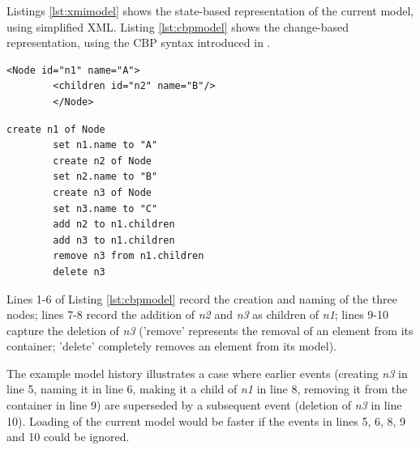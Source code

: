 \documentclass{llncs}
\begin{document}
    Listings \ref{lst:xmimodel} shows the state-based representation of the current model, using simplified XML.  Listing \ref{lst:cbpmodel} shows the change-based representation, using the CBP syntax introduced in \cite{yohannis2017turning}.
    
    \noindent
    \begin{minipage}[t]{0.5\linewidth}
        \begin{lstlisting}[style=xmi,caption={State-based tree model.},label=lst:xmimodel]
        <Node id="n1" name="A">
        <children id="n2" name="B"/>
        </Node>
        \end{lstlisting}
    \end{minipage}
    \hfill
    \begin{minipage}[t]{0.5\linewidth}
        \begin{lstlisting}[style=eol,caption={Change-based tree model.},label=lst:cbpmodel]
        create n1 of Node
        set n1.name to "A"      
        create n2 of Node
        set n2.name to "B"      
        create n3 of Node
        set n3.name to "C"      
        add n2 to n1.children   
        add n3 to n1.children
        remove n3 from n1.children   
        delete n3
        \end{lstlisting}
    \end{minipage}
    
    Lines 1-6 of Listing \ref{lst:cbpmodel} 
    record the creation and naming of the three nodes; lines 7-8 record the addition of \emph{n2} and \emph{n3} as children of \emph{n1}; lines 9-10 capture the deletion of \emph{n3} ('remove'   represents the removal of an element from its container; 'delete' completely removes an element from its model).
    
    
    
    The example model history illustrates a case where  earlier events (creating \emph{n3} in line 5, naming it in line 6, making it a child of \emph{n1} in line 8, removing it from the container in line 9) are superseded by a subsequent event (deletion of \emph{n3} in line 10).  Loading of the current model would be faster if the events in lines 5, 6, 8, 9 and 10 could be ignored.
    
\end{document}
